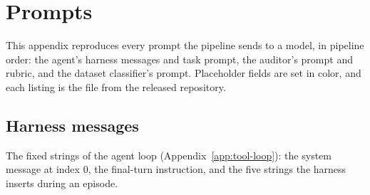 \section{Prompts}
\label{app:prompt-listings}

This appendix reproduces every prompt the pipeline sends to a model, in
pipeline order: the agent's harness messages and task prompt, the auditor's
prompt and rubric, and the dataset classifier's prompt. Placeholder fields
are set in color, and each listing is the file from the released repository.

\subsection{Harness messages}
The fixed strings of the agent loop (Appendix~\ref{app:tool-loop}): the
system message at index 0, the final-turn instruction, and the five strings
the harness inserts during an episode.

